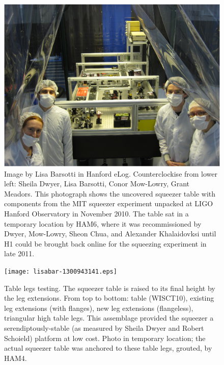 \begin{figure}
\begin{center}
\includegraphics[width=0.6\paperwidth]{lisabar-1289966130.eps}




\caption{Image by Lisa Barsotti in Hanford eLog.
\newline Counterclockise from lower left: Sheila Dwyer, Lisa Barsotti, Conor Mow-Lowry, Grant Meadors. This photograph shows the uncovered squeezer table with components from the MIT squeezer experiment unpacked at LIGO Hanford Observatory in November 2010. The table sat in a temporary location by HAM6, where it was recommissioned by Dwyer, Mow-Lowry, Sheon Chua, and Alexander Khalaidovksi until H1 could be brought back online for the squeezing experiment in late 2011. 
}
\end{center}
\end{figure}
\begin{figure}
\begin{center}
\texttt{[image: lisabar-1300943141.eps]}
\caption{Table legs testing. The squeezer table is raised to its final height by the leg extensions. From top to bottom: table (WISCT10), existing leg extensions (with flanges), new leg extensions (flangeless), triangular high table legs. This assemblage provided the squeezer a serendiptously-stable (as measured by Sheila Dwyer and Robert Schoield) platform at low cost. Photo in temporary location; the actual squeezer table was anchored to these table legs, grouted, by HAM4.
}
\end{center}
\end{figure}


